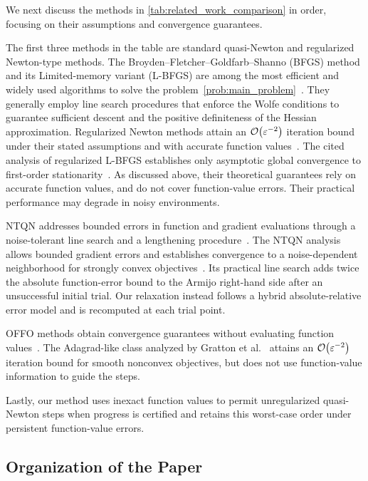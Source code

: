 \documentclass[journal_revised_MPC]{subfiles}
\begin{document}
\begin{MPCchange}
We next discuss the methods in \cref{tab:related_work_comparison} in order, focusing on their assumptions and convergence guarantees.

The first three methods in the table are standard quasi-Newton and regularized Newton-type methods.
The Broyden--Fletcher--Goldfarb--Shanno (BFGS) method and its Limited-memory variant (L-BFGS) are among the most efficient and widely used algorithms to solve the problem~\eqref{prob:main_problem}~\citep{liuLimitedMemoryBFGS1989,nocedal1999numerical}.
They generally employ line search procedures that enforce the Wolfe conditions to guarantee sufficient descent and the positive definiteness of the Hessian approximation.
Regularized Newton methods attain an $\order{\varepsilon^{-2}}$ iteration bound under their stated assumptions and with accurate function values~\citep[Theorem~4.2]{uedaConvergencePropertiesRegularized2010}.
The cited analysis of regularized L-BFGS establishes only asymptotic global convergence to first-order stationarity~\citep[Theorem~2]{kanzowRegularizationLimitedMemory2023}.
As discussed above, their theoretical guarantees rely on accurate function values, and do not cover function-value errors.
Their practical performance may degrade in noisy environments.

NTQN addresses bounded errors in function and gradient evaluations through a noise-tolerant line search and a lengthening procedure~\citep{shiNoiseTolerantQuasiNewtonAlgorithm2022}.
The NTQN analysis allows bounded gradient errors and establishes convergence to a noise-dependent neighborhood for strongly convex objectives~\citep[Theorem~3.5]{shiNoiseTolerantQuasiNewtonAlgorithm2022}.
Its practical line search adds twice the absolute function-error bound to the Armijo right-hand side after an unsuccessful initial trial.
Our relaxation instead follows a hybrid absolute-relative error model and is recomputed at each trial point.

OFFO methods obtain convergence guarantees without evaluating function values~\citep{Gratton08022024,grattonOFFOMinimizationAlgorithms2023}.
The Adagrad-like class analyzed by Gratton et al.~\citep{Gratton08022024} attains an $\order{\varepsilon^{-2}}$ iteration bound for smooth nonconvex objectives, but does not use function-value information to guide the steps.

Lastly, our method uses inexact function values to permit unregularized quasi-Newton steps when progress is certified and retains this worst-case order under persistent function-value errors.
\end{MPCchange}

\subsection{Organization of the Paper}

\ifSubfilesClassLoaded{
    
    
}{}
\end{document}
